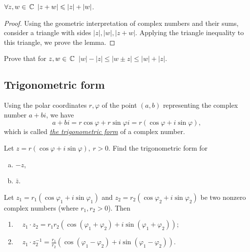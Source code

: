 \begin{lemma}
$\forall z, w\in\,\mathbb{C}\, ~|z + w|\leqslant |z| + |w|$.
\end{lemma}

\begin{proof} Using the geometric interpretation of complex numbers and their sums,
consider a triangle with sides $|z|, |w|, |z + w|$. Applying the triangle inequality
to this triangle, we prove the lemma.
\end{proof}

\begin{exercise}
Prove that for $z, w\in\,\mathbb{C}\,$ $|w| - |z|\leqslant |w \pm z|\leqslant |w| + |z|$.
\end{exercise}

\subsection{Trigonometric form}
Using the polar coordinates $r, \varphi$ of the point $(a, b)$ representing the complex number $a + bi$, we have
$$
a + bi = r\cos\varphi + r\sin\varphi i = r(\cos\varphi + i\sin\varphi),
$$
which is called \underline{\it the trigonometric form} of a complex number.

\begin{exercise}
Let $z = r(\cos\varphi + i\sin\varphi), ~r > 0$. Find the trigonometric form for
\begin{enumerate}[a) ]
\item $-z$,
\item $\bar{z}$.
\end{enumerate}
\end{exercise}

\begin{theorem}
Let $z_1=r_1\left(\cos \varphi_1+i \sin \varphi_1\right)$ and $z_2=r_2\left(\cos \varphi_2+i \sin \varphi_2\right)$ be two nonzero complex numbers (where $r_1, r_2 > 0$). Then
\begin{enumerate}
    \item $\quad z_1 \cdot z_2=r_1 r_2\left(\cos \left(\varphi_1+\varphi_2\right)+i \sin \left(\varphi_1+\varphi_2\right)\right)$;
    \item $\quad z_1 \cdot z_2^{-1}=\frac{r_1}{r_2}\left(\cos \left(\varphi_1-\varphi_2\right)+i \sin \left(\varphi_1-\varphi_2\right)\right)$.
\end{enumerate}
\end{theorem}

